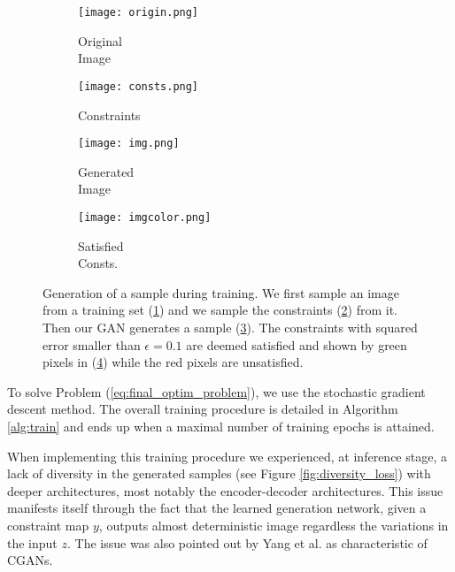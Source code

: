 \begin{figure}[t]
	\centering
	\begin{subfigure}[t]{0.25\textwidth}
		\centering
		\texttt{[image: origin.png]}
		\caption{Original\\Image}
		\label{fig:original_shoe}
	\end{subfigure}\begin{subfigure}[t]{0.25\textwidth}
		\centering
		\texttt{[image: consts.png]}
		\caption{Constraints}
		\label{fig:constraints}
	\end{subfigure}\begin{subfigure}[t]{0.25\textwidth}
		\centering
		\texttt{[image: img.png]}
		\caption{Generated\\Image}
		\label{fig:pixelwise}
	\end{subfigure}\begin{subfigure}[t]{0.24\textwidth}
		\centering
		\texttt{[image: imgcolor.png]}
		\caption{Satisfied\\Consts.}
		\label{fig:generated}
	\end{subfigure}
	\caption[Generation of a sample during training]{Generation of a sample during training. We first sample an image from a training set (\ref{fig:original_shoe}) and we sample the constraints (\ref{fig:constraints}) from it. Then our GAN generates a sample (\ref{fig:pixelwise}). The constraints with squared error smaller than $\epsilon=0.1$ are deemed satisfied and shown by green pixels in (\ref{fig:generated}) while the red pixels are unsatisfied.}
	\label{fig:image_completion}
\end{figure}



To solve Problem (\ref{eq:final_optim_problem}), we use the stochastic gradient descent method. The overall training procedure is detailed in Algorithm \ref{alg:train} and ends up when a maximal number of training epochs is attained. 

When implementing this training procedure we experienced, at inference stage, a lack of diversity in the generated samples (see Figure \ref{fig:diversity_loss}) with deeper architectures, most notably the encoder-decoder architectures. This issue manifests itself through the fact that the learned generation network, given a constraint map $y$, outputs almost deterministic image  regardless the variations in the input $z$. The issue was also pointed out by Yang et al. \citep{Yang2019} as characteristic of CGANs.




